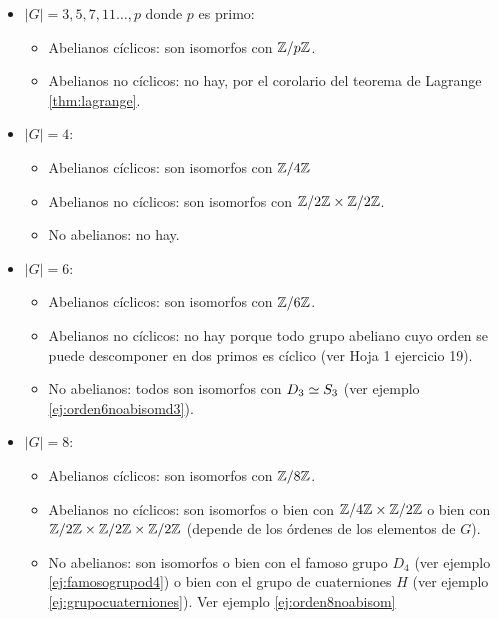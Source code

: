 \begin{thm}$ $\newline
	
	\begin{itemize}
		\item $|G| = 3, 5, 7, 11 \dots, p$ donde $p$ es primo:
		\begin{itemize}
			\item Abelianos cíclicos: son isomorfos con $\mathbb{Z}/p\mathbb{Z}$.
			\item Abelianos no cíclicos: no hay, por el corolario del teorema de Lagrange \ref{thm:lagrange}.
		\end{itemize}
		\item $|G| = 4$:
		\begin{itemize}
			\item Abelianos cíclicos: son isomorfos con $\mathbb{Z}/4\mathbb{Z}$
			\item Abelianos no cíclicos: son isomorfos con $\mathbb{Z}/2\mathbb{Z} \times \mathbb{Z}/2\mathbb{Z}$.
			\item No abelianos: no hay.
		\end{itemize}
		\item $|G| = 6$:
		\begin{itemize}
			\item Abelianos cíclicos: son isomorfos con $\mathbb{Z}/6\mathbb{Z}$.
			\item Abelianos no cíclicos: no hay porque todo grupo abeliano cuyo orden se puede descomponer en dos primos es cíclico (ver Hoja 1 ejercicio 19).
			\item No abelianos: todos son isomorfos con $D_3 \simeq S_3$ (ver ejemplo \ref{ej:orden6noabisomd3}).
		\end{itemize}
		\item $|G| = 8$:
		\begin{itemize}
			\item Abelianos cíclicos: son isomorfos con $\mathbb{Z}/8\mathbb{Z}$.
			\item Abelianos no cíclicos: son isomorfos o bien con $\mathbb{Z}/4\mathbb{Z} \times \mathbb{Z}/2\mathbb{Z}$ o bien con $\mathbb{Z}/2\mathbb{Z} \times \mathbb{Z}/2\mathbb{Z} \times \mathbb{Z}/2\mathbb{Z}$ (depende de los órdenes de los elementos de $G$).
			\item No abelianos: son isomorfos o bien con el famoso grupo $D_4$ (ver ejemplo \ref{ej:famosogrupod4}) o bien con el grupo de cuaterniones $H$ (ver ejemplo \ref{ej:grupocuaterniones}). Ver ejemplo \ref{ej:orden8noabisom}
		\end{itemize}
	\end{itemize}
	
\end{thm}

